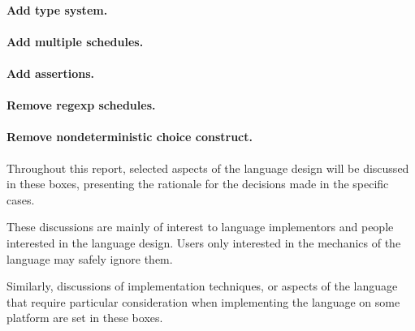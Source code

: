 \paragraph{Add type system.}

\paragraph{Add multiple schedules.}

\paragraph{Add assertions.}

\paragraph{Remove regexp schedules.}

\paragraph{Remove nondeterministic choice construct.}


\newpage

\begin{rationale}
  Throughout this report, selected aspects of the language design will
  be discussed in these boxes, presenting the rationale for the
  decisions made in the specific cases.
  
  These discussions are mainly of interest to language implementors
  and people interested in the language design. Users only interested
  in the mechanics of the language may safely ignore them.
\end{rationale}

\begin{implementation}
  Similarly, discussions of implementation techniques, or aspects of
  the language that require particular consideration when implementing
  the language on some platform are set in these boxes.
\end{implementation}


















